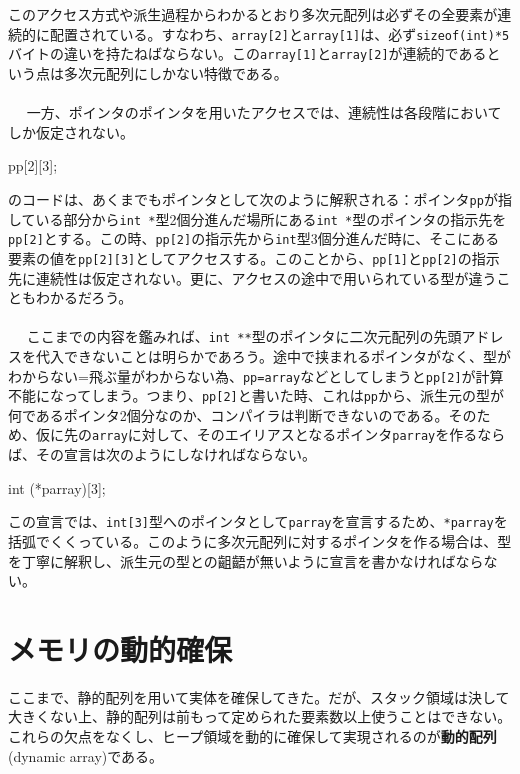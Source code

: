 このアクセス方式や派生過程からわかるとおり多次元配列は必ずその全要素が連続的に配置されている。すなわち、\verb|array[2]|と\verb|array[1]|は、必ず\verb|sizeof(int)*5|バイトの違いを持たねばならない。この\verb|array[1]|と\verb|array[2]|が連続的であるという点は多次元配列にしかない特徴である。
\\ \\　
一方、ポインタのポインタを用いたアクセスでは、連続性は各段階においてしか仮定されない。
\begin{code}
pp[2][3];
\end{code}
のコードは、あくまでもポインタとして次のように解釈される：ポインタ\verb|pp|が指している部分から\verb|int *|型2個分進んだ場所にある\verb|int *|型のポインタの指示先を\verb|pp[2]|とする。この時、\verb|pp[2]|の指示先から\verb|int|型3個分進んだ時に、そこにある要素の値を\verb|pp[2][3]|としてアクセスする。このことから、\verb|pp[1]|と\verb|pp[2]|の指示先に連続性は仮定されない。更に、アクセスの途中で用いられている型が違うこともわかるだろう。
\\ \\　
ここまでの内容を鑑みれば、\verb|int **|型のポインタに二次元配列の先頭アドレスを代入できないことは明らかであろう。途中で挟まれるポインタがなく、型がわからない=飛ぶ量がわからない為、\verb|pp=array|などとしてしまうと\verb|pp[2]|が計算不能になってしまう。つまり、\verb|pp[2]|と書いた時、これは\verb|pp|から、派生元の型が何であるポインタ2個分なのか、コンパイラは判断できないのである。そのため、仮に先の\verb|array|に対して、そのエイリアスとなるポインタ\verb|parray|を作るならば、その宣言は次のようにしなければならない。
\begin{code}
int (*parray)[3];
\end{code}
この宣言では、\verb|int[3]|型へのポインタとして\verb|parray|を宣言するため、\verb|*parray|を括弧でくくっている。このように多次元配列に対するポインタを作る場合は、型を丁寧に解釈し、派生元の型との齟齬が無いように宣言を書かなければならない。

\section{メモリの動的確保}
ここまで、静的配列を用いて実体を確保してきた。だが、スタック領域は決して大きくない上、静的配列は前もって定められた要素数以上使うことはできない。これらの欠点をなくし、ヒープ領域を動的に確保して実現されるのが\textbf{動的配列}(dynamic array)である。
